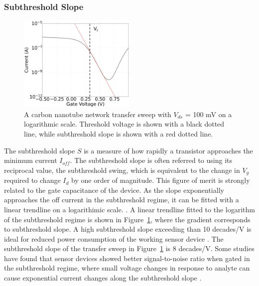 \documentclass[
  a4paper,
]{scrbook}
\begin{document}
\hypertarget{subthreshold-slope}{%
\subsubsection*{Subthreshold Slope}\label{subthreshold-slope}}

\begin{figure}

{\centering \includegraphics[width=0.5\textwidth,height=\textheight]{figures/ch2/NTQ31C5ch1subthreshold_slope_alt.png}

}

\caption{\label{fig-subthreshold-slope}A carbon nanotube network
transfer sweep with \(V_{ds}\) = 100 mV on a logarithmic scale.
Threshold voltage is shown with a black dotted line, while subthreshold
slope is shown with a red dotted line.}

\end{figure}

The subthreshold slope \(S\) is a measure of how rapidly a transistor
approaches the minimum current \(I_{off}\). The subthreshold slope is
often referred to using its reciprocal value, the subthreshold swing,
which is equivalent to the change in \(V_g\) required to change \(I_d\)
by one order of magnitude. This figure of merit is strongly related to
the gate capacitance of the device. As the slope exponentially
approaches the off current in the subthreshold regime, it can be fitted
with a linear trendline on a logarithimic scale.
\autocite{Sze2006,Petti2016}. A linear trendline fitted to the logarithm
of the subthreshold regime is shown in
Figure~\ref{fig-subthreshold-slope}, where the gradient corresponds to
subthreshold slope. A high subthreshold slope exceeding than 10
decades/V is ideal for reduced power consumption of the working sensor
device \autocite{Petti2016}. The subthreshold slope of the transfer
sweep in Figure~\ref{fig-subthreshold-slope} is 8 decades/V. Some
studies have found that sensor devices showed better signal-to-noise
ratio when gated in the subthreshold regime, where small voltage changes
in response to analyte can cause exponential current changes along the
subthreshold slope \autocite{Heller2009,Gao2010}.
\end{document}
